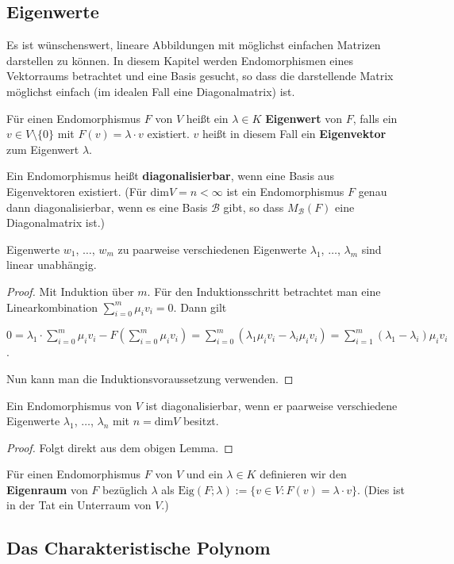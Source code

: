 \subsection{Eigenwerte}
Es ist wünschenswert, lineare Abbildungen mit möglichst einfachen Matrizen
darstellen zu können. In diesem Kapitel werden Endomorphismen eines Vektorraums
betrachtet und eine Basis gesucht, so dass die darstellende Matrix möglichst
einfach (im idealen Fall eine Diagonalmatrix) ist.

\begin{definition} Für einen Endomorphismus $F$  von $V$ heißt ein $\lambda \in
K$ \textbf{Eigenwert} von $F$, falls ein $v \in V \setminus \{ 0 \}$ mit $F(v) =
\lambda \cdot v$ existiert. $v$ heißt in diesem Fall ein \textbf{Eigenvektor}
zum Eigenwert $\lambda$.
\end{definition}

\begin{definition} Ein Endomorphismus heißt \textbf{diagonalisierbar}, wenn eine
Basis aus Eigenvektoren existiert. (Für $\text{dim}V = n < \infty$ ist ein
Endomorphismus $F$ genau dann diagonalisierbar, wenn es eine Basis $\mathcal{B}$
gibt, so dass  $M_{\mathcal{B}}(F)$ eine Diagonalmatrix ist.)
\end{definition}

\begin{lemma} Eigenwerte $w_1$, $\ldots$, $w_m$ zu paarweise verschiedenen
Eigenwerte $\lambda_1$, $\ldots$, $\lambda_m$ sind linear unabhängig.
\end{lemma}
\begin{proof}
Mit Induktion über $m$. Für den Induktionsschritt betrachtet man eine
Linearkombination $\sum_{i=0}^m \mu_i v_i = 0$. Dann gilt
\begin{center}
$0 = \lambda_1 \cdot \sum_{i=0}^m \mu_i v_i - F\left( \sum_{i=0}^m \mu_i v_i
\right) = \sum_{i=0}^m (\lambda_1 \mu_i v_i-\lambda_i \mu_i v_i) =
\sum_{i=1}^m (\lambda_1 - \lambda_i) \mu_i v_i$.
\end{center}
Nun kann man die Induktionsvoraussetzung verwenden.
\end{proof}

\begin{satz} Ein Endomorphismus von $V$ ist diagonalisierbar, wenn er paarweise
verschiedene Eigenwerte $\lambda_1$, $\ldots$, $\lambda_n$ mit $n = \text{dim}
V$ besitzt.
\end{satz}
\begin{proof}
Folgt direkt aus dem obigen Lemma.
\end{proof}

\begin{definition} Für einen Endomorphismus $F$ von $V$ und ein $\lambda \in K$
definieren wir den \textbf{Eigenraum} von $F$ bezüglich $\lambda$ als
$\text{Eig}( F ; \lambda ) := \{ v \in V: F(v) = \lambda \cdot v \}$. (Dies ist
in der Tat ein Unterraum von $V$.)
\end{definition}

\subsection{Das Charakteristische Polynom}
